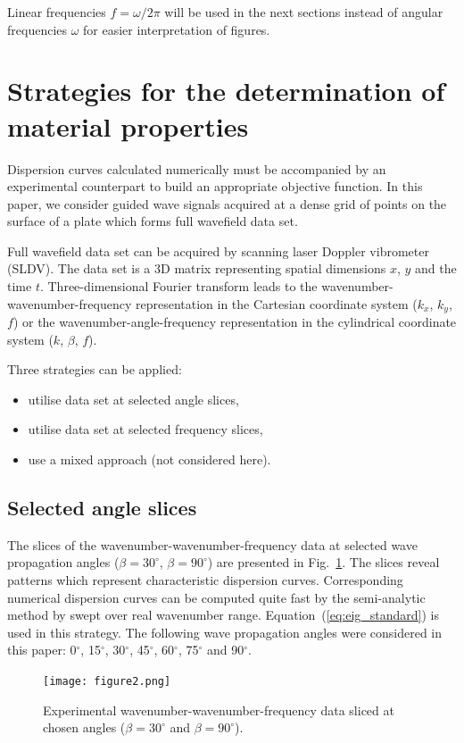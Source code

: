 \documentclass[preprint,12pt]{elsarticle}
\begin{document}
Linear frequencies $f=\omega/2 \pi$ will be used in the next sections instead of angular frequencies $\omega$ for easier interpretation of figures.
\section{Strategies for the determination of material properties \label{sec:strategies}}
Dispersion curves calculated numerically must be accompanied by an experimental counterpart to build an appropriate objective function. 
In this paper, we consider guided wave signals acquired at a dense grid of points on the surface of a plate which forms full wavefield data set. 

Full wavefield data set can be acquired by scanning laser Doppler vibrometer (SLDV).
The data set is a 3D matrix representing spatial dimensions $x$, $y$ and the time $t$. 
Three-dimensional Fourier transform leads to the wavenumber-wavenumber-frequency representation  in the Cartesian coordinate system ($k_x$, $k_y$, $f$) or the wavenumber-angle-frequency representation in the cylindrical coordinate system ($k$, $\beta$, $f$).

Three strategies can be applied:
\begin{itemize}
	\item utilise data set at selected angle slices,
	\item utilise data set at selected frequency slices,
	\item use a mixed approach (not considered here).
\end{itemize}
\subsection{Selected angle slices}
The slices of the wavenumber-wavenumber-frequency data at selected wave propagation angles ($\beta=30^{\circ}$, $\beta=90^{\circ}$) are presented in Fig.~\ref{fig:angle_slice}. 
The slices reveal patterns which represent characteristic dispersion curves. 
Corresponding numerical dispersion curves can be computed quite fast by the semi-analytic method by swept over real wavenumber range.
Equation~(\ref{eq:eig_standard}) is used in this strategy.
The following wave propagation angles were considered in this paper: 0$^{\circ}$, 15$^{\circ}$, 30$^{\circ}$, 45$^{\circ}$, 60$^{\circ}$, 75$^{\circ}$ and 90$^{\circ}$.
\begin{figure} [h!]
	\centering
	\texttt{[image: figure2.png]}	
	\caption{Experimental wavenumber-wavenumber-frequency data sliced at chosen angles ($\beta=30^{\circ}$ and $\beta=90^{\circ}$).}
	\label{fig:angle_slice}
\end{figure}
\end{document}

